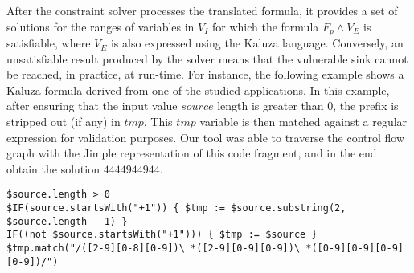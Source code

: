 After the constraint solver processes the translated formula, it provides a set of solutions for the ranges of variables in $V_I$ for which the formula $F_p \wedge V_E$ is satisfiable, {\color{blue} where $V_E$ is also expressed using the Kaluza language.} Conversely, an unsatisfiable result produced by the solver means that the vulnerable sink cannot be reached, in practice, at run-time. For instance, the following example shows a Kaluza formula derived from one of the studied applications. In this example, after ensuring that the input value $source$ length is greater than 0, the prefix is stripped out (if any) in $tmp$. This $tmp$ variable is then matched against a regular expression for validation purposes. Our tool was able to traverse the control flow graph with the Jimple representation of this code fragment, and in the end obtain the solution $444494 4944$.
\lstset{numbers=left,xleftmargin=1cm, basicstyle=\ttfamily\scriptsize, breaklines=true}
\begin{lstlisting}
$source.length > 0
$IF(source.startsWith("+1")) { $tmp := $source.substring(2, $source.length - 1) }
IF((not $source.startsWith("+1"))) { $tmp := $source }
$tmp.match("/([2-9][0-8][0-9])\ *([2-9][0-9][0-9])\ *([0-9][0-9][0-9][0-9])/")
\end{lstlisting}


